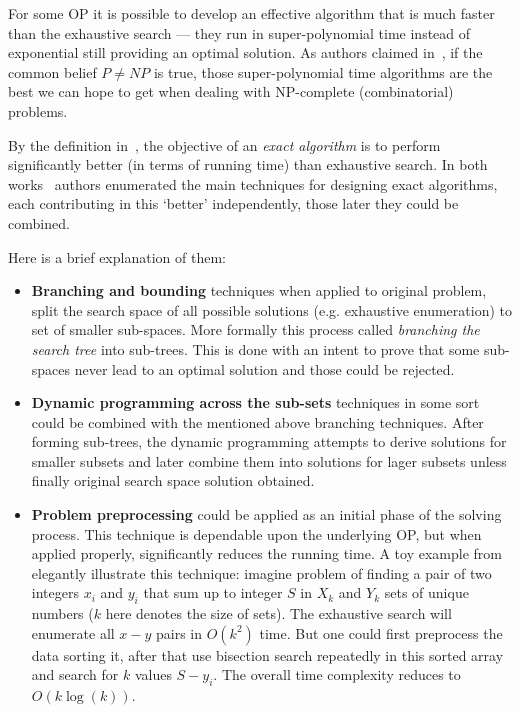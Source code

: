 For some OP it is possible to develop an effective algorithm that is much faster than the exhaustive search — they run in super-polynomial time instead of exponential still providing an optimal solution. As authors claimed in~\cite{woeginger2003exact}, if the common belief $P \ne NP$ is true, those super-polynomial time algorithms are the best we can hope to get when dealing with NP-complete (combinatorial) problems.

By the definition in~\cite{fomin2013exact}, the objective of an \textit{exact algorithm} is to perform significantly better (in terms of running time) than exhaustive search. In both works~\cite{woeginger2003exact,fomin2013exact} authors enumerated the main techniques for designing exact algorithms, each contributing in this `better' independently, those later they could be combined.

Here is a brief explanation of them:
\begin{itemize}[itemsep=8pt]
	\item \textbf{Branching and bounding} techniques when applied to original problem, split the search space of all possible solutions (e.g. exhaustive enumeration) to set of smaller sub-spaces. More formally this process called \textit{branching the search tree} into sub-trees. This is done with an intent to prove that some sub-spaces never lead to an optimal solution and those could be rejected.
	
	\item \textbf{Dynamic programming across the sub-sets} techniques in some sort could be combined with the mentioned above branching techniques. After forming sub-trees, the dynamic programming attempts to derive solutions for smaller subsets and later combine them into solutions for lager subsets unless finally original search space solution obtained.
	
	\item \textbf{Problem preprocessing} could be applied as an initial phase of the solving process. This technique is dependable upon the underlying OP, but when applied properly, significantly reduces the running time. A toy example from~\cite{woeginger2003exact} elegantly illustrate this technique: imagine problem of finding a pair of two integers $x_i$ and $y_i$ that sum up to integer $S$ in $X_k$ and $Y_k$ sets of unique numbers ($k$ here denotes the size of sets). The exhaustive search will enumerate all $x-y$ pairs in $O(k^2)$ time. But one could first preprocess the data sorting it, after that use bisection search repeatedly in this sorted array and search for $k$ values $S - y_i$. The overall time complexity reduces to $O(k\log(k))$.
\end{itemize}

